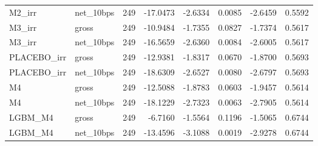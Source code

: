\begin{tabular}{llrrrrrr}
M2\_irr & net\_10bps & 249 & -17.0473 & -2.6334 & 0.0085 & -2.6459 & 0.5592 \\
M3\_irr & gross & 249 & -10.9484 & -1.7355 & 0.0827 & -1.7374 & 0.5617 \\
M3\_irr & net\_10bps & 249 & -16.5659 & -2.6360 & 0.0084 & -2.6005 & 0.5617 \\
PLACEBO\_irr & gross & 249 & -12.9381 & -1.8317 & 0.0670 & -1.8700 & 0.5693 \\
PLACEBO\_irr & net\_10bps & 249 & -18.6309 & -2.6527 & 0.0080 & -2.6797 & 0.5693 \\
M4 & gross & 249 & -12.5088 & -1.8783 & 0.0603 & -1.9457 & 0.5614 \\
M4 & net\_10bps & 249 & -18.1229 & -2.7323 & 0.0063 & -2.7905 & 0.5614 \\
LGBM\_M4 & gross & 249 & -6.7160 & -1.5564 & 0.1196 & -1.5065 & 0.6744 \\
LGBM\_M4 & net\_10bps & 249 & -13.4596 & -3.1088 & 0.0019 & -2.9278 & 0.6744 \\
\bottomrule
\end{tabular}
